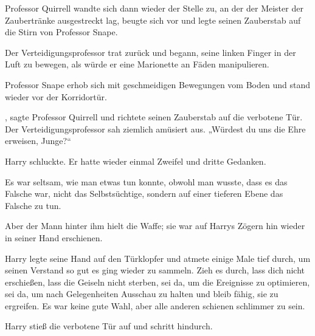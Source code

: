 Professor Quirrell wandte sich dann wieder der Stelle zu, an der der Meister der Zaubertränke ausgestreckt lag, beugte sich vor und legte seinen Zauberstab auf die Stirn von Professor Snape. 

Der Verteidigungsprofessor trat zurück und begann, seine linken Finger in der Luft zu bewegen, als würde er eine Marionette an Fäden manipulieren.

Professor Snape erhob sich mit geschmeidigen Bewegungen vom Boden und stand wieder vor der Korridortür.

, sagte Professor Quirrell und richtete seinen Zauberstab auf die verbotene Tür.
Der Verteidigungsprofessor sah ziemlich amüsiert aus.
„Würdest du uns die Ehre erweisen, Junge?“

Harry schluckte. Er hatte wieder einmal Zweifel und dritte Gedanken.

Es war seltsam, wie man etwas tun konnte, obwohl man wusste, dass es das Falsche war, nicht das Selbstsüchtige, sondern auf einer tieferen Ebene das Falsche zu tun.

Aber der Mann hinter ihm hielt die Waffe; sie war auf Harrys Zögern hin wieder in seiner Hand erschienen.

Harry legte seine Hand auf den Türklopfer und atmete einige Male tief durch, um seinen Verstand so gut es ging wieder zu sammeln.
Zieh es durch, lass dich nicht erschießen, lass die Geiseln nicht sterben, sei da, um die Ereignisse zu optimieren, sei da, um nach Gelegenheiten Ausschau zu halten und bleib fähig, sie zu ergreifen. Es war keine gute Wahl, aber alle anderen schienen schlimmer zu sein.

Harry stieß die verbotene Tür auf und schritt hindurch.

